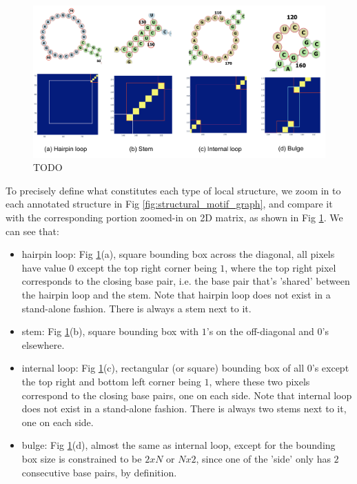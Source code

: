 \documentclass[12pt]{article}
\begin{document}
\begin{figure}[h]
    \centering
    \includegraphics[width=\textwidth]{plot/local_bounding_box_examples.png}
    \caption{TODO}
    \label{fig:local_bounding_box_examples}
    \centering
\end{figure}


To precisely define what constitutes each type of local structure,
we zoom in to each annotated structure in Fig \ref{fig:structural_motif_graph},
and compare it with the corresponding portion zoomed-in on 2D matrix, as shown in
Fig \ref{fig:local_bounding_box_examples}.
We can see that:

\begin{itemize}
    \item hairpin loop: Fig \ref{fig:local_bounding_box_examples}(a),
    square bounding box across the diagonal, all pixels have value $0$ except the top right corner being $1$,
    where the top right pixel corresponds to the
    closing base pair, i.e. the base pair that's 'shared' between the hairpin loop and the stem.
    Note that hairpin loop does not exist in a stand-alone fashion.
    There is always a stem next to it.

    \item stem: Fig \ref{fig:local_bounding_box_examples}(b),
    square bounding box with $1$'s on the off-diagonal and $0$'s elsewhere.


    \item internal loop: Fig \ref{fig:local_bounding_box_examples}(c),
    rectangular (or square) bounding box of all $0$'s except the top right and bottom left corner being $1$,
    where these two pixels correspond to the closing base pairs, one on each side.
    Note that internal loop does not exist in a stand-alone fashion.
    There is always two stems next to it, one on each side.

    \item bulge: Fig \ref{fig:local_bounding_box_examples}(d),
    almost the same as internal loop, except for the bounding box size is constrained
    to be $2xN$ or $Nx2$, since one of the 'side' only has $2$ consecutive base pairs, by definition.
\end{itemize}
\end{document}
